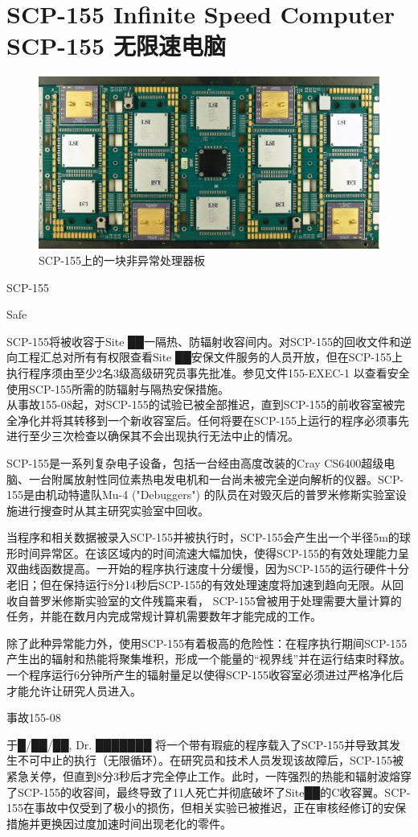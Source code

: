 \chapter[SCP-155 无限速电脑]{
    SCP-155 Infinite Speed Computer \\
    SCP-155 无限速电脑
}

\label{chap:SCP-155}

\begin{figure}[H]
    \centering
    \includegraphics[width=0.5\linewidth]{images/SCP-155.jpg}
    \caption*{SCP-155上的一块非异常处理器板}
\end{figure}

SCP-155

Safe

SCP-155将被收容于Site ██一隔热、防辐射收容间内。对SCP-155的回收文件和逆向工程汇总对所有有权限查看Site ██安保文件服务的人员开放，但在SCP-155上执行程序须由至少2名3级高级研究员事先批准。参见文件155-EXEC-1 以查看安全使用SCP-155所需的防辐射与隔热安保措施。\\
从事故155-08起，对SCP-155的试验已被全部推迟，直到SCP-155的前收容室被完全净化并将其转移到一个新收容室后。任何将要在SCP-155上运行的程序必须事先进行至少三次检查以确保其不会出现执行无法中止的情况。

SCP-155是一系列复杂电子设备，包括一台经由高度改装的Cray CS6400超级电脑、一台附属放射性同位素热电发电机和一台尚未被完全逆向解析的仪器。SCP-155是由机动特遣队Mu-4 ("Debuggers") 的队员在对毁灭后的普罗米修斯实验室设施进行搜查时从其主研究实验室中回收。

当程序和相关数据被录入SCP-155并被执行时，SCP-155会产生出一个半径5m的球形时间异常区。在该区域内的时间流速大幅加快，使得SCP-155的有效处理能力呈双曲线函数提高。一开始的程序执行速度十分缓慢，因为SCP-155的运行硬件十分老旧；但在保持运行8分14秒后SCP-155的有效处理速度将加速到趋向无限。从回收自普罗米修斯实验室的文件残篇来看， SCP-155曾被用于处理需要大量计算的任务，并能在数月内完成常规计算机需要数年才能完成的工作。

除了此种异常能力外，使用SCP-155有着极高的危险性：在程序执行期间SCP-155产生出的辐射和热能将聚集堆积，形成一个能量的“视界线”并在运行结束时释放。一个程序运行6分钟所产生的辐射量足以使得SCP-155收容室必须进过严格净化后才能允许让研究人员进入。

事故155-08

于█\slash ██\slash ██, Dr. ███████ 将一个带有瑕疵的程序载入了SCP-155并导致其发生不可中止的执行（无限循环）。在研究员和技术人员发现该故障后，SCP-155被紧急关停，但直到8分3秒后才完全停止工作。此时，一阵强烈的热能和辐射波熔穿了SCP-155的收容间，最终导致了11人死亡并彻底破坏了Site██的C收容翼。SCP-155在事故中仅受到了极小的损伤，但相关实验已被推迟，正在审核经修订的安保措施并更换因过度加速时间出现老化的零件。
